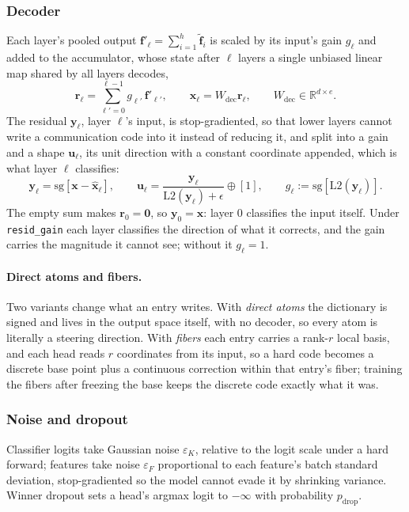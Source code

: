 \subsubsection{Decoder}
\label{sec:decoder}
Each layer's pooled output $\mathbf{f}'_\ell = \sum_{i=1}^{h}\tilde{\mathbf{f}}_{i}$ is scaled
by its input's gain $g_\ell$ and added to the accumulator, whose state
after $\ell$ layers a single unbiased linear map shared by all layers
decodes,
\begin{equation}
	\mathbf{r}_\ell = \sum_{\ell'=0}^{\ell-1} g_{\ell'}\,\mathbf{f}'_{\ell'},
	\qquad
	\hat{\mathbf{x}}_\ell = W_{\mathrm{dec}}\mathbf{r}_\ell,
	\qquad
	W_{\mathrm{dec}} \in \mathbb{R}^{d \times e}.
	\label{eq:dec}
\end{equation}
The residual $\mathbf{y}_\ell$, layer $\ell$'s input, is stop-gradiented,
so that lower layers cannot write a communication code into it instead
of reducing it, and split into a gain and a shape $\mathbf{u}_\ell$, its
unit direction with a constant coordinate appended, which is what layer
$\ell$ classifies:
\begin{equation}
	\mathbf{y}_\ell = \mathrm{sg}\!\left[\mathbf{x} - \hat{\mathbf{x}}_\ell\right],
	\qquad
	\mathbf{u}_\ell =
	\frac{\mathbf{y}_\ell}{\mathrm{L2}(\mathbf{y}_\ell) + \epsilon} \oplus [1],
	\qquad
	g_{\ell} := \mathrm{sg}\!\left[\mathrm{L2}(\mathbf{y}_\ell)\right].
	\label{eq:y_norm}
\end{equation}
The empty sum makes $\mathbf{r}_0 = \mathbf{0}$, so $\mathbf{y}_0 = \mathbf{x}$:
layer 0 classifies the input itself.
Under \texttt{resid\_gain} each layer classifies the direction of what it
corrects, and the gain carries the magnitude it cannot see; without it
$g_\ell = 1$.

\paragraph{Direct atoms and fibers.}
Two variants change what an entry writes. With \emph{direct atoms} the
dictionary is signed and lives in the output space itself, with no
decoder, so every atom is literally a steering direction. With
\emph{fibers} each entry carries a rank-$r$ local basis, and each head
reads $r$ coordinates from its input, so a hard code becomes a discrete
base point plus a continuous correction within that entry's fiber;
training the fibers after freezing the base keeps the discrete code
exactly what it was.

\subsubsection{Noise and dropout}
\label{sec:noise}
Classifier logits take Gaussian noise $\varepsilon_K$, relative to the
logit scale under a hard forward; features take noise $\varepsilon_F$
proportional to each feature's batch standard deviation, stop-gradiented
so the model cannot evade it by shrinking variance. Winner dropout sets a
head's argmax logit to $-\infty$ with probability $p_{\mathrm{drop}}$.

